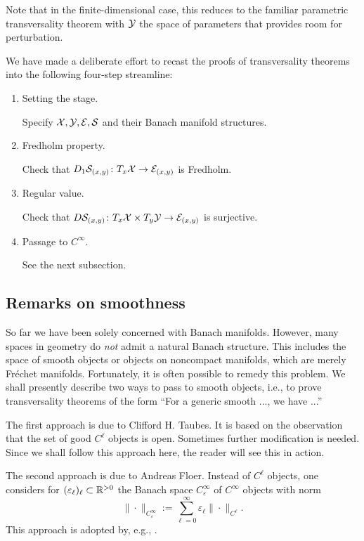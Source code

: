 \begin{remark}
	Note that in the finite-dimensional case, this reduces to 
	the familiar parametric transversality theorem 
	with ${\mathcal{Y}}$ the space of parameters that provides room for perturbation.
\end{remark}

\medskip

We have made a deliberate effort to recast the proofs 
of transversality theorems into the following four-step streamline:

\begin{enumerate}
	\item Setting the stage.
		
		Specify ${\mathcal{X}}, {\mathcal{Y}}, {\mathcal{E}}, {\mathcal{S}}$ and their Banach manifold structures.
	
	\item Fredholm property.
		
		Check that $D_1{\mathcal{S}}_{(x, y)} \colon T_x {\mathcal{X}} \to {\mathcal{E}}_{(x, y)}$ is Fredholm.
	
	\item Regular value.
		
		Check that $D{\mathcal{S}}_{(x, y)} \colon T_x {\mathcal{X}} \times T_y {\mathcal{Y}} \to {\mathcal{E}}_{(x, y)}$ 
		is surjective.
	
	\item Passage to $C^\infty$.
		
		See the next subsection.
\end{enumerate}

\subsection{Remarks on smoothness}
So far we have been solely concerned with Banach manifolds. 
However, many spaces in geometry do \textit{not} 
admit a natural Banach structure. 
This includes the space of smooth objects or objects on noncompact 
manifolds, which are merely Fr{\'e}chet manifolds. 
Fortunately, it is often possible to remedy this problem. 
We shall presently describe two ways to pass to smooth objects, 
i.e., to prove transversality theorems of the form 
``For a generic smooth ..., we have ...''

The first approach is due to Clifford H. Taubes. 
It is based on the observation that 
the set of good $C^\ell$ objects is open. 
Sometimes further modification is needed. 
Since we shall follow this approach here, 
the reader will see this in action.

The second approach is due to Andreas Floer. 
Instead of $C^\ell$ objects, one considers 
for $(\varepsilon_\ell)_\ell \subset {\mathbb{R}}^{>0}$ 
the Banach space $C_\varepsilon^\infty$ of $C^\infty$ objects 
with norm 
\[
	\mathclose{\|} \cdot \mathclose{\|} _{C_\varepsilon^\infty} := 
		\sum _{\ell = 0} ^\infty \varepsilon_\ell 
		\mathclose{\|} \cdot\mathcal{\|} _{C^\ell}.
\]
This approach is adopted by, e.g., \cite{Sch}.